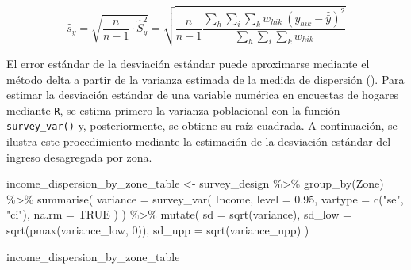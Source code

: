 \documentclass[
  spanish,
  11pt,
  letterpaper,
  oneside,
  open=any]{scrbook}
\newenvironment{Shaded}{\begin{snugshade}}{\end{snugshade}}
\newcommand{\AttributeTok}[1]{\textcolor[rgb]{0.40,0.45,0.13}{#1}}
\newcommand{\ConstantTok}[1]{\textcolor[rgb]{0.56,0.35,0.01}{#1}}
\newcommand{\DecValTok}[1]{\textcolor[rgb]{0.68,0.00,0.00}{#1}}
\newcommand{\FloatTok}[1]{\textcolor[rgb]{0.68,0.00,0.00}{#1}}
\newcommand{\FunctionTok}[1]{\textcolor[rgb]{0.28,0.35,0.67}{#1}}
\newcommand{\NormalTok}[1]{\textcolor[rgb]{0.00,0.23,0.31}{#1}}
\newcommand{\OtherTok}[1]{\textcolor[rgb]{0.00,0.23,0.31}{#1}}
\newcommand{\SpecialCharTok}[1]{\textcolor[rgb]{0.37,0.37,0.37}{#1}}
\newcommand{\StringTok}[1]{\textcolor[rgb]{0.13,0.47,0.30}{#1}}
\begin{document}
\[
\hat s_y  =
\sqrt{\frac{n}{n-1} \cdot \hat{S}^2_y} =  \sqrt{\frac{n}{n-1}\frac{\sum_{h}\sum_{i}\sum_{k} w_{hik} \ \left(y_{hik}-\hat{\bar{y}}\right)^{2}}{\sum_{h}\sum_{i}\sum_{k} w_{hik}}}
\]

El error estándar de la desviación estándar puede aproximarse mediante
el método delta a partir de la varianza estimada de la medida de
dispersión (). Para
estimar la desviación estándar de una variable numérica en encuestas de
hogares mediante \texttt{R}, se estima primero la varianza poblacional
con la función \texttt{survey\_var()} y, posteriormente, se obtiene su
raíz cuadrada. A continuación, se ilustra este procedimiento mediante la
estimación de la desviación estándar del ingreso desagregada por zona.

\begin{Shaded}
\begin{Highlighting}[]
\NormalTok{income\_dispersion\_by\_zone\_table }\OtherTok{\textless{}{-}}\NormalTok{ survey\_design }\SpecialCharTok{\%\textgreater{}\%}
  \FunctionTok{group\_by}\NormalTok{(Zone) }\SpecialCharTok{\%\textgreater{}\%}
  \FunctionTok{summarise}\NormalTok{(}
    \AttributeTok{variance =} \FunctionTok{survey\_var}\NormalTok{(}
\NormalTok{      Income,}
      \AttributeTok{level =} \FloatTok{0.95}\NormalTok{,}
      \AttributeTok{vartype =} \FunctionTok{c}\NormalTok{(}\StringTok{"se"}\NormalTok{, }\StringTok{"ci"}\NormalTok{),}
      \AttributeTok{na.rm =} \ConstantTok{TRUE}
\NormalTok{    )}
\NormalTok{  ) }\SpecialCharTok{\%\textgreater{}\%}
  \FunctionTok{mutate}\NormalTok{(}
    \AttributeTok{sd =} \FunctionTok{sqrt}\NormalTok{(variance),}
    \AttributeTok{sd\_low =} \FunctionTok{sqrt}\NormalTok{(}\FunctionTok{pmax}\NormalTok{(variance\_low, }\DecValTok{0}\NormalTok{)),}
    \AttributeTok{sd\_upp =} \FunctionTok{sqrt}\NormalTok{(variance\_upp)}
\NormalTok{  )}

\NormalTok{income\_dispersion\_by\_zone\_table}
\end{Highlighting}
\end{Shaded}
\end{document}
